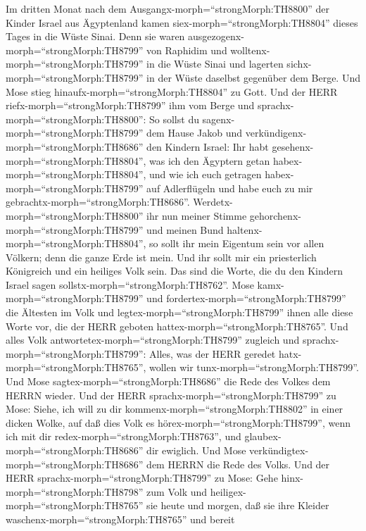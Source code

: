  Im dritten Monat nach dem
Ausgangx-morph=``strongMorph:TH8800'' der Kinder Israel aus Ägyptenland
kamen siex-morph=``strongMorph:TH8804'' dieses Tages in die Wüste Sinai.
 Denn sie waren ausgezogenx-morph=``strongMorph:TH8799'' von
Raphidim und wolltenx-morph=``strongMorph:TH8799'' in die Wüste Sinai
und lagerten sichx-morph=``strongMorph:TH8799'' in der Wüste daselbst
gegenüber dem Berge.  Und Mose stieg
hinaufx-morph=``strongMorph:TH8804'' zu Gott. Und der HERR
riefx-morph=``strongMorph:TH8799'' ihm vom Berge und
sprachx-morph=``strongMorph:TH8800'': So sollst du
sagenx-morph=``strongMorph:TH8799'' dem Hause Jakob und
verkündigenx-morph=``strongMorph:TH8686'' den Kindern Israel:
 Ihr habt gesehenx-morph=``strongMorph:TH8804'', was ich den
Ägyptern getan habex-morph=``strongMorph:TH8804'', und wie ich euch
getragen habex-morph=``strongMorph:TH8799'' auf Adlerflügeln und habe
euch zu mir gebrachtx-morph=``strongMorph:TH8686''. 
Werdetx-morph=``strongMorph:TH8800'' ihr nun meiner Stimme
gehorchenx-morph=``strongMorph:TH8799'' und meinen Bund
haltenx-morph=``strongMorph:TH8804'', so sollt ihr mein Eigentum sein
vor allen Völkern; denn die ganze Erde ist mein.  Und ihr
sollt mir ein priesterlich Königreich und ein heiliges Volk sein. Das
sind die Worte, die du den Kindern Israel sagen
sollstx-morph=``strongMorph:TH8762''.  Mose
kamx-morph=``strongMorph:TH8799'' und
fordertex-morph=``strongMorph:TH8799'' die Ältesten im Volk und
legtex-morph=``strongMorph:TH8799'' ihnen alle diese Worte vor, die der
HERR geboten hattex-morph=``strongMorph:TH8765''.  Und alles
Volk antwortetex-morph=``strongMorph:TH8799'' zugleich und
sprachx-morph=``strongMorph:TH8799'': Alles, was der HERR geredet
hatx-morph=``strongMorph:TH8765'', wollen wir
tunx-morph=``strongMorph:TH8799''. Und Mose
sagtex-morph=``strongMorph:TH8686'' die Rede des Volkes dem HERRN
wieder.  Und der HERR sprachx-morph=``strongMorph:TH8799''
zu Mose: Siehe, ich will zu dir kommenx-morph=``strongMorph:TH8802'' in
einer dicken Wolke, auf daß dies Volk es
hörex-morph=``strongMorph:TH8799'', wenn ich mit dir
redex-morph=``strongMorph:TH8763'', und
glaubex-morph=``strongMorph:TH8686'' dir ewiglich. Und Mose
verkündigtex-morph=``strongMorph:TH8686'' dem HERRN die Rede des Volks.
 Und der HERR sprachx-morph=``strongMorph:TH8799'' zu Mose:
Gehe hinx-morph=``strongMorph:TH8798'' zum Volk und
heiligex-morph=``strongMorph:TH8765'' sie heute und morgen, daß sie ihre
Kleider waschenx-morph=``strongMorph:TH8765''  und bereit
